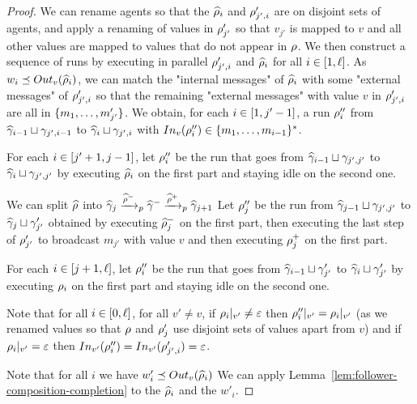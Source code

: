 \begin{proof}
We can rename agents so that the $\widehat{\run}_i$ and $\run'_{j',i}$ are on disjoint sets of agents, and apply a renaming of values in $\run'_{j'}$ so that $v_{j'}$ is mapped to $v$ and all other values are mapped to values that do not appear in $\run$.
We then construct a sequence of runs by executing in parallel $\run_{j',i}'$ and $\widehat{\run}_i$ for all $i\in\nset{1}{\ell}$. As $w_i \subword \voutput{v}{\widehat{\run}_i}$, we can match the "internal messages" of $\widehat{\run}_i$ with some "external messages" of $\run'_{j',i}$ so that the remaining "external messages" with value $v$ in $\run'_{j',i}$ are all in $\set{m_1, \ldots, m'_{j'}}$. 
We obtain, for each $i \in \nset{1}{j'-1}$, a run $\run''_i$ from $\widehat{\config}_{i-1} \sqcup \config_{j', i-1}$ to $\widehat{\config}_{i} \sqcup \config_{j', i}$ with $\vinput{v}{\run''_i} \in \set{m_1, \ldots, m_{i-1}}^*$. 

For each $i \in \nset{j'+1}{j-1}$, let $\run''_i$ be the run that goes from $\widehat{\config}_{i-1} \sqcup \config_{j', j'}$ to $\widehat{\config}_{i} \sqcup \config_{j', j'}$ by executing $\widehat{\run}_i$ on the first part and staying idle on the second one.

We can split $\widehat{\run}$ into $\widehat{\config}_{j} \pstep{\widehat{\run}^-} \widehat{\config}^- \pstep{\widehat{\run}^+} \widehat{\config}_{j+1}$
Let $\run''_j$ be the run from $\widehat{\config}_{j-1} \sqcup \config_{j', j'}$ to $\widehat{\config}_{j} \sqcup \config'_{j'}$ obtained by executing $\widehat{\run}_{j}^-$ on the first part, then executing the last step of $\run'_{j'}$ to broadcast $m_{j'}$ with value $v$ and then executing $\run_{j}^+$ on the first part.

For each $i \in \nset{j+1}{\ell}$, let $\run''_i$ be the run that goes from $\widehat{\config}_{i-1} \sqcup \config'_{j'}$ to $\widehat{\config}_{i} \sqcup \config'_{j'}$ by executing $\run_i$ on the first part and staying idle on the second one.

Note that for all $i \in \nset{0}{\ell}$, for all $v' \neq v$, if $\vproj{v'}{\run_i} \neq \epsilon$ then $\vproj{v'}{\run''_i} = \vproj{v'}{\run_i}$ (as we renamed values so that $\run$ and $\run'_j$ use disjoint sets of values apart from $v$) and if $\vproj{v'}{\run_i} = \epsilon$ then $\vinput{v'}{\run''_i} = \vinput{v'}{\run'_{j',i}} = \epsilon$.

Note that for all $i$ we have $w'_i \subword \voutput{v}{\widehat{\run}_i}$
We can apply Lemma~\ref{lem:follower-composition-completion} to the $\widehat{\run}_i$ and the $w'_i$.


\end{proof}
